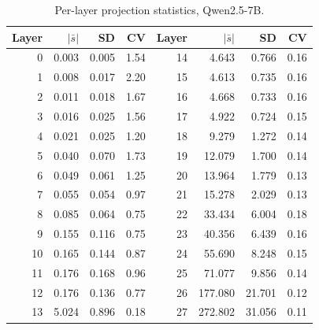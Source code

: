 \begin{table}[t]
  \centering
  \small
  \caption{Per-layer projection statistics, Qwen2.5-7B.}
  \label{tab:cv_qwen7b}
  \begin{tabular}{rrrr@{\hskip 2em}rrrr}
    \toprule
    Layer & $|\bar s|$ & SD & CV & Layer & $|\bar s|$ & SD & CV \\
    \midrule
    0 & 0.003 & 0.005 & 1.54 & 14 & 4.643 & 0.766 & 0.16 \\
    1 & 0.008 & 0.017 & 2.20 & 15 & 4.613 & 0.735 & 0.16 \\
    2 & 0.011 & 0.018 & 1.67 & 16 & 4.668 & 0.733 & 0.16 \\
    3 & 0.016 & 0.025 & 1.56 & 17 & 4.922 & 0.724 & 0.15 \\
    4 & 0.021 & 0.025 & 1.20 & 18 & 9.279 & 1.272 & 0.14 \\
    5 & 0.040 & 0.070 & 1.73 & 19 & 12.079 & 1.700 & 0.14 \\
    6 & 0.049 & 0.061 & 1.25 & 20 & 13.964 & 1.779 & 0.13 \\
    7 & 0.055 & 0.054 & 0.97 & 21 & 15.278 & 2.029 & 0.13 \\
    8 & 0.085 & 0.064 & 0.75 & 22 & 33.434 & 6.004 & 0.18 \\
    9 & 0.155 & 0.116 & 0.75 & 23 & 40.356 & 6.439 & 0.16 \\
    10 & 0.165 & 0.144 & 0.87 & 24 & 55.690 & 8.248 & 0.15 \\
    11 & 0.176 & 0.168 & 0.96 & 25 & 71.077 & 9.856 & 0.14 \\
    12 & 0.176 & 0.136 & 0.77 & 26 & 177.080 & 21.701 & 0.12 \\
    13 & 5.024 & 0.896 & 0.18 & 27 & 272.802 & 31.056 & 0.11 \\
    \bottomrule
  \end{tabular}
\end{table}

